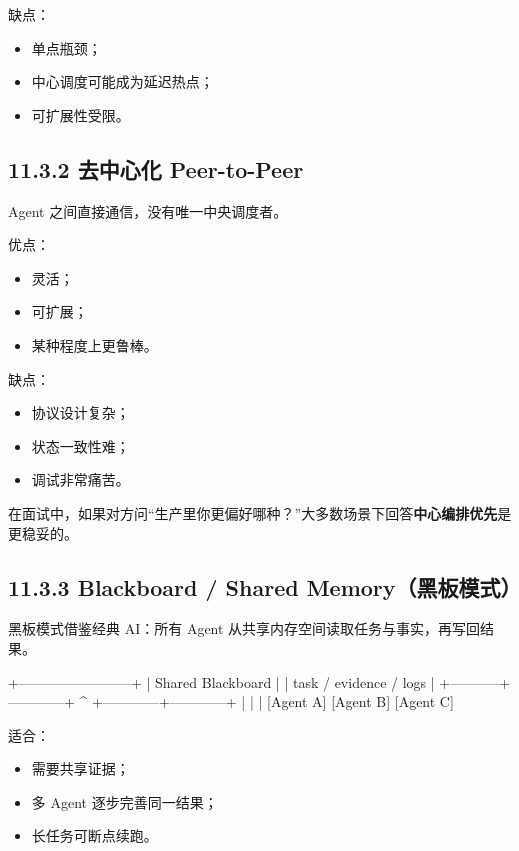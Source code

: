 缺点：


\begin{itemize}[leftmargin=2em]
\item 单点瓶颈；
\item 中心调度可能成为延迟热点；
\item 可扩展性受限。
\end{itemize}

\subsection{11.3.2 去中心化 Peer-to-Peer}

Agent 之间直接通信，没有唯一中央调度者。


优点：


\begin{itemize}[leftmargin=2em]
\item 灵活；
\item 可扩展；
\item 某种程度上更鲁棒。
\end{itemize}

缺点：


\begin{itemize}[leftmargin=2em]
\item 协议设计复杂；
\item 状态一致性难；
\item 调试非常痛苦。
\end{itemize}

在面试中，如果对方问``生产里你更偏好哪种？''大多数场景下回答\textbf{中心编排优先}是更稳妥的。


\subsection{11.3.3 Blackboard / Shared Memory（黑板模式）}

黑板模式借鉴经典 AI：所有 Agent 从共享内存空间读取任务与事实，再写回结果。


\begin{codeblock}
           +------------------------+
           |   Shared Blackboard    |
           | task / evidence / logs |
           +-----------+------------+
                       ^
          +------------+------------+
          |            |            |
      [Agent A]    [Agent B]    [Agent C]
\end{codeblock}

适合：


\begin{itemize}[leftmargin=2em]
\item 需要共享证据；
\item 多 Agent 逐步完善同一结果；
\item 长任务可断点续跑。
\end{itemize}


